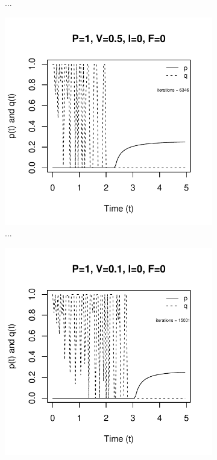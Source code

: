 \documentclass[12pt, oneside]{article}   	%
\begin{document}
\begin{figure}[h]
\begin{subfigure}[t]{0.45\textwidth}
        \caption{...} \label{fig:...}
    \end{subfigure}
     \centering
    \begin{subfigure}[t]{0.45\textwidth}
        \centering
       \includegraphics[width=\linewidth]{../../figures/unbranched-determinate-P=1-V=05,uniform(0,5)}  
        \caption{...} \label{fig:...}
    \end{subfigure}
    \hfill
    \begin{subfigure}[t]{0.45\textwidth}
        \centering
       \includegraphics[width=\linewidth]{../../figures/unbranched-determinate-P=1-V=01,uniform(0,5)}  

\end{subfigure}
\end{figure}
\end{document}
